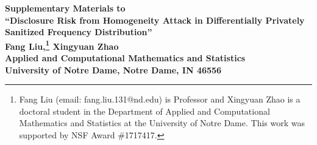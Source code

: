 \documentclass[10pt,journal,compsoc]{IEEEtran}
\begin{document}
\setcounter{page}{1}
\setcounter{figure}{0}
\setcounter{table}{0}
\setcounter{equation}{0}
\setcounter{section}{0}


\renewcommand{\thepage}{S\arabic{page}}
\renewcommand{\thesection}{S\arabic{section}}
\renewcommand{\thetable}{S\arabic{table}}
\renewcommand{\thefigure}{S\arabic{figure}}
\renewcommand{\theequation}{S\arabic{equation}}
\renewcommand{\thecor}{S\arabic{thm}}

\onecolumn

\begin{center} \LARGE\bf{Supplementary Materials to \\
``Disclosure Risk from Homogeneity Attack in Differentially Privately Sanitized Frequency Distribution''} \\
\vspace{12pt}
\large{\textbf{ Fang Liu,\footnote{\noindent Fang Liu (email: fang.liu.131@nd.edu) is Professor and Xingyuan Zhao is a doctoral student in the Department of Applied and Computational Mathematics and Statistics at the University of Notre Dame. This work was supported by NSF Award \#1717417.} Xingyuan Zhao}\\
\vspace{6pt}
\normalsize{Applied and Computational Mathematics and Statistics}\\
\vspace{3pt}
\normalsize{University of Notre Dame, Notre Dame, IN 46556}}
\end{center}

\normalsize


\normalsize
\end{document}
